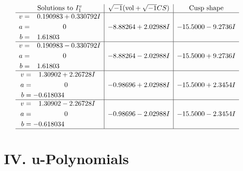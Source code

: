 \documentclass[1p]{elsarticle_modified}
\theoremstyle{definition}
\newcommand{\I}{\sqrt{-1}}
\begin{document}
$$\begin{array}{c|c|c}  
\text{Solutions to }I^v_{1}& \I (\text{vol} + \sqrt{-1}CS) & \text{Cusp shape}\\
 \hline 
\begin{aligned}
v &= \phantom{-}0.190983 + 0.330792 I \\
a &= \phantom{-0.000000 } 0 \\
b &= \phantom{-}1.61803\phantom{ +0.000000I}\end{aligned}
 & -8.88264 + 2.02988 I & -15.5000 - 9.2736 I \\ \hline\begin{aligned}
v &= \phantom{-}0.190983 - 0.330792 I \\
a &= \phantom{-0.000000 } 0 \\
b &= \phantom{-}1.61803\phantom{ +0.000000I}\end{aligned}
 & -8.88264 - 2.02988 I & -15.5000 + 9.2736 I \\ \hline\begin{aligned}
v &= \phantom{-}1.30902 + 2.26728 I \\
a &= \phantom{-0.000000 } 0 \\
b &= -0.618034\phantom{ +0.000000I}\end{aligned}
 & -0.98696 + 2.02988 I & -15.5000 + 2.3454 I \\ \hline\begin{aligned}
v &= \phantom{-}1.30902 - 2.26728 I \\
a &= \phantom{-0.000000 } 0 \\
b &= -0.618034\phantom{ +0.000000I}\end{aligned}
 & -0.98696 - 2.02988 I & -15.5000 - 2.3454 I\\
 \hline 
 \end{array}$$\newpage
\newpage\renewcommand{\arraystretch}{1}
\centering \section*{ IV. u-Polynomials}
\end{document}
